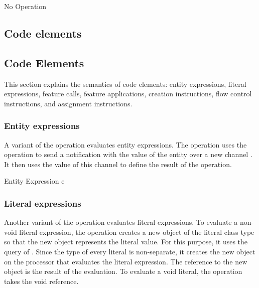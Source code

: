 \singlelineinferencerule
	{No Operation}
	{}
	{}
	{}
 
\begin{fortechnicalreport}
\subsection{Code elements}
\end{fortechnicalreport}
\begin{forjournal}
\subsection{Code Elements}
\end{forjournal}
This section explains the semantics of code elements: entity expressions, literal expressions, feature calls, feature applications, creation instructions, flow control instructions, and assignment instructions.

\subsubsection{Entity expressions}
A variant of the  operation evaluates entity expressions. The operation uses the  operation to send a notification with the value of the entity over a new channel . It then uses the value of this channel to define the result of the  operation.

\singlelineinferencerule
	{Entity Expression}
	{
		e \in \entitytype \\
	}
	{}
	{}
 
\subsubsection{Literal expressions}
Another variant of the  operation evaluates literal expressions. To evaluate a non-void literal expression, the operation creates a new object of the literal class type so that the new object represents the literal value. For this purpose, it uses the query  of . Since the type of every literal is non-separate, it creates the new object on the processor that evaluates the literal expression. The reference  to the new object is the result of the evaluation. To evaluate a void literal, the operation takes the void reference.

